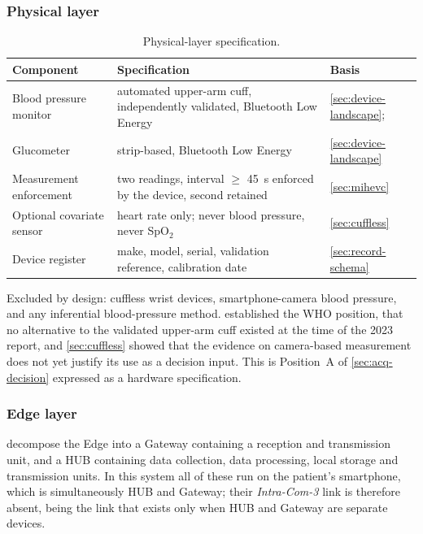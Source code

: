\documentclass[12pt,a4paper,oneside]{report}
\begin{document}
\subsubsection{Physical layer}

\begin{table}[htbp]
\centering\small
\caption{Physical-layer specification.}\label{tab:physical-layer}
\begin{tabularx}{\textwidth}{@{}>{\raggedright\arraybackslash}p{3.6cm} X >{\raggedright\arraybackslash}p{2.9cm}@{}}
\toprule
\textbf{Component} & \textbf{Specification} & \textbf{Basis} \\
\midrule
Blood pressure monitor & automated upper-arm cuff, independently validated, Bluetooth Low Energy & \cref{sec:device-landscape}; \textcite{who2023hypertension} \\
Glucometer & strip-based, Bluetooth Low Energy & \cref{sec:device-landscape} \\
Measurement enforcement & two readings, interval $\geq$ 45~s enforced by the device, second retained & \cref{sec:mihevc} \\
Optional covariate sensor & heart rate only; never blood pressure, never SpO$_2$ & \cref{sec:cuffless} \\
Device register & make, model, serial, validation reference, calibration date & \cref{sec:record-schema} \\
\bottomrule
\end{tabularx}
\end{table}

Excluded by design: cuffless wrist devices, smartphone-camera blood pressure, and any inferential blood-pressure method.  established the WHO position, that no alternative to the validated upper-arm cuff existed at the time of the 2023 report, and \cref{sec:cuffless} showed that the evidence on camera-based measurement does not yet justify its use as a decision input. This is Position~A of \cref{sec:acq-decision} expressed as a hardware specification.

\subsubsection{Edge layer}\label{sec:edge-layer}

\Textcite{mucchi2021} decompose the Edge into a Gateway containing a reception and transmission unit, and a HUB containing data collection, data processing, local storage and transmission units. In this system all of these run on the patient's smartphone, which is simultaneously HUB and Gateway; their \emph{Intra-Com-3} link is therefore absent, being the link that exists only when HUB and Gateway are separate devices.
\end{document}
